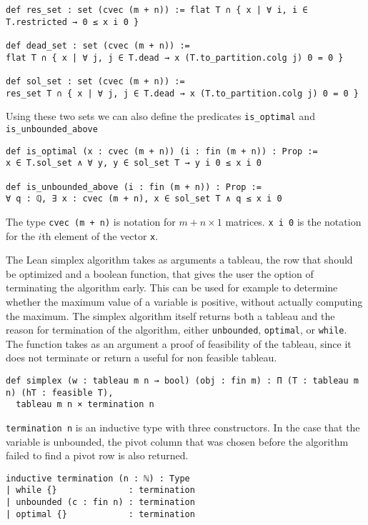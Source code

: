 \documentclass[11pt]{article} %
\begin{document}
\begin{lstlisting}
def res_set : set (cvec (m + n)) := flat T ∩ { x | ∀ i, i ∈ T.restricted → 0 ≤ x i 0 }

def dead_set : set (cvec (m + n)) :=
flat T ∩ { x | ∀ j, j ∈ T.dead → x (T.to_partition.colg j) 0 = 0 }

def sol_set : set (cvec (m + n)) :=
res_set T ∩ { x | ∀ j, j ∈ T.dead → x (T.to_partition.colg j) 0 = 0 }
\end{lstlisting}

Using these two sets we can also define the predicates \lstinline|is_optimal| and \lstinline|is_unbounded_above|
\begin{lstlisting}
def is_optimal (x : cvec (m + n)) (i : fin (m + n)) : Prop :=
x ∈ T.sol_set ∧ ∀ y, y ∈ sol_set T → y i 0 ≤ x i 0

def is_unbounded_above (i : fin (m + n)) : Prop :=
∀ q : ℚ, ∃ x : cvec (m + n), x ∈ sol_set T ∧ q ≤ x i 0
\end{lstlisting}

The type \lstinline|cvec (m + n)| is notation for $m + n \times 1$ matrices. \lstinline|x i 0| is the notation for the $i$th element of the vector  \lstinline|x|.

The Lean simplex algorithm takes as arguments a tableau, the row that should be optimized and a boolean function, that gives the user the option of terminating the algorithm early. This can be used for example to determine whether the maximum value of a variable is positive, without actually computing the maximum. The simplex algorithm itself returns both a tableau and the reason for termination of the algorithm, either \lstinline|unbounded|, \lstinline|optimal|, or \lstinline|while|. The function takes as an argument a proof of feasibility of the tableau, since it does not terminate or return a useful for non feasible tableau.
\begin{lstlisting}
def simplex (w : tableau m n → bool) (obj : fin m) : Π (T : tableau m n) (hT : feasible T),
  tableau m n × termination n
\end{lstlisting}

\lstinline|termination n| is an inductive type with three constructors. In the case that the variable is unbounded, the pivot column that was chosen before the algorithm failed to find a pivot row is also returned.
\begin{lstlisting}
inductive termination (n : ℕ) : Type
| while {}              : termination
| unbounded (c : fin n) : termination
| optimal {}            : termination
\end{lstlisting}
\end{document}
